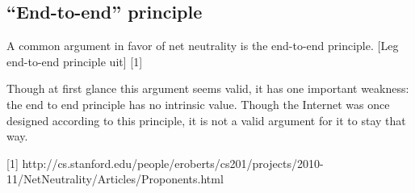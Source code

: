 
\subsection{``End-to-end'' principle}
A common argument in favor of net neutrality is the end-to-end principle. [Leg end-to-end principle uit] [1]

Though at first glance this argument seems valid, it has one important weakness: the end to end principle has no intrinsic value. Though the Internet was once designed according to this principle, it is not a valid argument for it to stay that way.


[1] http://cs.stanford.edu/people/eroberts/cs201/projects/2010-11/NetNeutrality/Articles/Proponents.html